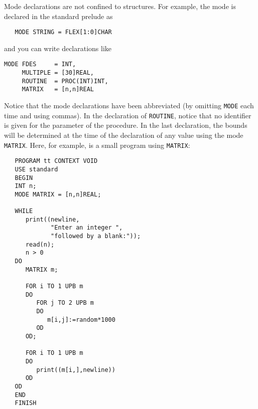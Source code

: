 Mode declarations are not confined to structures. For example, the
mode  is declared in the standard prelude as
\begin{verbatim}
   MODE STRING = FLEX[1:0]CHAR
\end{verbatim}
\noindent
and you can write declarations like
\begin{verbatim}
MODE FDES     = INT,
     MULTIPLE = [30]REAL,
     ROUTINE  = PROC(INT)INT,
     MATRIX   = [n,n]REAL
\end{verbatim}
\noindent
Notice that the mode declarations have been abbreviated (by omitting
\verb|MODE| each time and using commas). In the declaration of
\verb|ROUTINE|, notice that no identifier is given for the parameter of
the procedure. In the last declaration, the bounds will be determined
at the time of the declaration of any value using the mode
\verb|MATRIX|. Here, for example, is a small program using
\verb|MATRIX|:
\begin{verbatim}
   PROGRAM tt CONTEXT VOID
   USE standard
   BEGIN
   INT n;
   MODE MATRIX = [n,n]REAL;

   WHILE   
      print((newline,
             "Enter an integer ",
             "followed by a blank:"));
      read(n);
      n > 0
   DO
      MATRIX m;

      FOR i TO 1 UPB m
      DO
         FOR j TO 2 UPB m
         DO
            m[i,j]:=random*1000
         OD
      OD;

      FOR i TO 1 UPB m
      DO
         print((m[i,],newline))
      OD
   OD
   END
   FINISH
\end{verbatim}
\newpage

